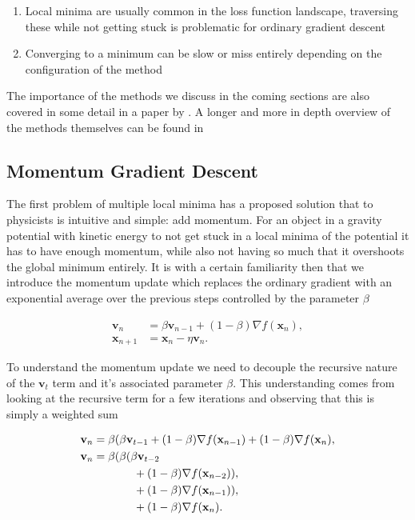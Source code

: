 \begin{enumerate}[start=0, label={(\bfseries C\arabic*):}]
\item Local minima are usually common in the loss function landscape, traversing these while not getting stuck is problematic for ordinary gradient descent
\item Converging to a minimum  can be slow or miss entirely depending on the configuration of the method 
\end{enumerate}

\noindent The importance of the methods we discuss in the coming sections are also covered in some detail in a paper by \citet{Sutskever2013}. A longer and more in depth overview of the methods themselves can be found in \citet{Ruder}

\subsection{Momentum Gradient Descent}\label{sec:momentum_gd}

The first problem of multiple local minima has a proposed solution that to physicists is intuitive and simple: add momentum. For an object in a gravity potential with kinetic energy to not get stuck in a local minima of the potential it has to have enough momentum, while also not having so much that it overshoots the global minimum entirely. It is with a certain familiarity then that we introduce the momentum update which replaces the ordinary gradient with an exponential average over the previous steps controlled by the parameter $\beta$

\begin{equation}\label{eq:momentum}
\begin{split}
\mathbf{v}_n &= \beta \mathbf{v}_{n-1} + (1 - \beta) \nabla f(\mathbf{x}_{n}),\\
\mathbf{x}_{n+1} &= \mathbf{x}_n - \eta\mathbf{v}_n .
\end{split}
\end{equation}


\noindent To understand the momentum update we need to decouple the recursive nature of the $\mathbf{v}_t$ term and it's associated parameter $\beta$. This understanding comes from looking at the recursive term for a few iterations and observing that this is simply a weighted sum 

\begin{align*}
\mathbf{v}_n &= \beta(\beta \mathbf{v}_{t-1} + (1-\beta)\nabla f(\mathbf{x}_{n-1})+ (1-\beta)\nabla f(\mathbf{x}_{n}), \\
\mathbf{v}_n &= \beta(\beta (\beta \mathbf{v}_{t-2} \\& \hspace{0.5in}+ (1-\beta)\nabla f(\mathbf{x}_{n-2})), \\
& \hspace{0.5in}+ (1-\beta)\nabla f(\mathbf{x}_{n-1})), \\
& \hspace{0.5in}+ (1-\beta)\nabla f(\mathbf{x}_{n}).
\end{align*}

